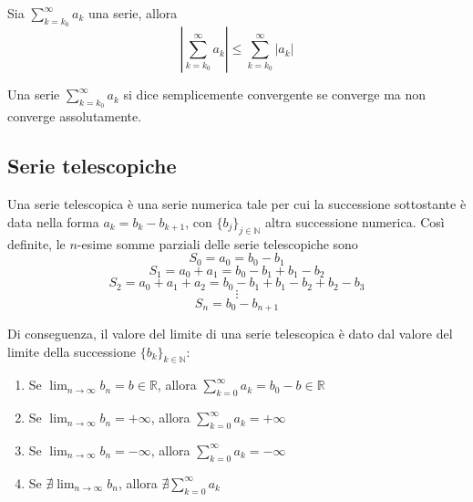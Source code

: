        \begin{proposition}
            Sia $\sum_{k = k_{0}}^{\infty} a_{k}$ una serie, allora
            \[
                \left| \sum_{k = k_{0}}^{\infty} a_{k} \right| \leq \sum_{k = k_{0}}^{\infty} |a_{k}|
            \]
        \end{proposition}

        \begin{definition}
            Una serie $\sum_{k = k_{0}}^{\infty} a_{k}$ si dice semplicemente convergente se converge ma non converge assolutamente.
        \end{definition}


        \subsection{Serie telescopiche}
            Una serie telescopica è una serie numerica tale per cui la successione sottostante è data nella forma $a_{k} = b_{k} - b_{k+1}$, con $\{b_{j}\}_{j \in \mathbb{N}}$ altra successione numerica.
            Così definite, le $n$-esime somme parziali delle serie telescopiche sono
            \[ S_{0} = a_{0} = b_{0} - b_{1} \]
            \[ S_{1} = a_{0} + a_{1} = b_{0} - b_{1} + b_{1} - b_{2} \]
            \[ S_{2} = a_{0} + a_{1} + a_{2} = b_{0} - b_{1} + b_{1} - b_{2} + b_{2} - b_{3} \]
            \[ \vdots \]
            \[ S_{n} = b_{0} - b_{n+1} \]

            Di conseguenza, il valore del limite di una serie telescopica è dato dal valore del limite della successione $\{b_{k}\}_{k \in \mathbb{N}}$:
            \begin{enumerate}[label=(\arabic*)]
                \item Se $\displaystyle \lim_{n \rightarrow \infty} b_{n} = b \in \mathbb{R}$, allora $\displaystyle \sum_{k = 0}^{\infty} a_{k} = b_{0} - b \in \mathbb{R}$
                \item Se $\displaystyle \lim_{n \rightarrow \infty} b_{n} = +\infty$, allora $\displaystyle \sum_{k = 0}^{\infty} a_{k} = +\infty$
                \item Se $\displaystyle \lim_{n \rightarrow \infty} b_{n} = -\infty$, allora $\displaystyle \sum_{k = 0}^{\infty} a_{k} = -\infty$
                \item Se $\displaystyle \nexists \lim_{n \rightarrow \infty} b_{n}$, allora $\displaystyle \nexists \sum_{k = 0}^{\infty} a_{k}$
            \end{enumerate}



